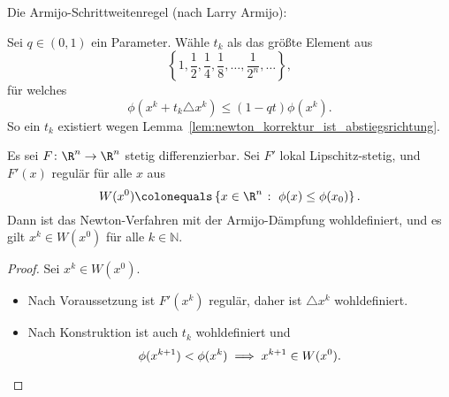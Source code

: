 \bigskip

Die Armijo-Schrittweitenregel (nach Larry Armijo):

Sei $q \in (0,1)$ ein Parameter. Wähle $t_k$ als das größte Element aus
\begin{equation*}
\left\lbrace 1,\frac{1}{2},\frac{1}{4},\frac{1}{8},\ldots,\frac{1}{2^n},\ldots \right\rbrace,
\end{equation*}
für welches
\begin{equation*}
 \phi (x^k+t_k \triangle x^k ) \leq (1-qt) \phi (x^k).
\end{equation*}
So ein $t_k$ existiert wegen Lemma~\ref{lem:newton_korrektur_ist_abstiegsrichtung}.

\begin{satz}
Es sei $F \colon \R^n \to \R^n$ stetig differenzierbar.
Sei $F'$ lokal Lipschitz-stetig, und $F'(x)$ regulär für alle $x$ aus
\begin{equation*}
 W (x^0)\colonequals\left\lbrace x \in \R^n \; \colon \; \phi(x) \leq \phi (x_0 ) \right\rbrace.
\end{equation*}
Dann ist das Newton-Verfahren mit der Armijo-Dämpfung wohldefiniert, und es gilt
$x^k \in W(x^0)$ für alle $k \in \mathbb{N}$.
\end{satz}
%
\begin{proof}
Sei $x^k \in W (x^0)$.
\begin{itemize}
 \item Nach Voraussetzung ist $F' (x^k )$ regulär, daher ist $\triangle x^k$ wohldefiniert.
 \item Nach Konstruktion ist auch $t_k$ wohldefiniert und
  \begin{equation*}
   \phi (x^{k+1} )<\phi (x^k ) \implies x^{k+1} \in W (x^0).
   \qedhere
  \end{equation*}
\end{itemize}
\end{proof}


